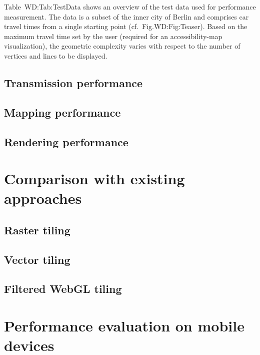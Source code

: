       Table~{WD:Tab:TestData} shows an overview of the test data used for performance
      measurement. The data is a subset of the inner city of Berlin and comprises car
      travel times from a single starting point (cf.~Fig.{WD:Fig:Teaser}). Based on
      the maximum travel time set by the user (required for an accessibility-map visualization),
      the geometric complexity varies with respect to the number of vertices and lines
      to be displayed.\par
    \subsection{Transmission performance}
    \subsection{Mapping performance}
    \subsection{Rendering performance}
  \section{Comparison with existing approaches}
    \subsection{Raster tiling}
    \subsection{Vector tiling}
    \subsection{Filtered WebGL tiling}
  \section{Performance evaluation on mobile devices}
